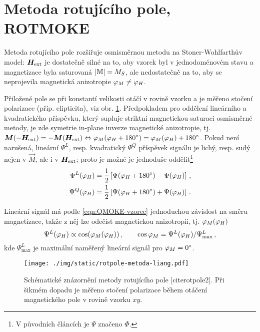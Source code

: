 \section{Metoda rotujícího pole, ROTMOKE}
\label{chap:ROTMOKE}

Metoda rotujícího pole\cite{liangSeparationLinearQuadratic2015,liangQuantitativeStudyQuadratic2015} rozšiřuje osmisměrnou metodu na Stoner-Wohlfarthův model: $\bm{H}_\textrm{ext}$ je dostatečně silné na to, aby vzorek byl v jednodoménovém stavu a magnetizace byla saturovaná $|\mathbb{M}|=M_S$, ale nedostatečně na to, aby se neprojevila magnetická anizotropie $\varphi_M\neq\varphi_H$.

Přiložené pole se při konstantí velikosti otáčí v rovině vzorku a je měřeno stočení polarizace (příp. elipticita), viz obr. \ref{fig:metoda-rotujiciho-pole}.
Předpokladem pro oddělení lineárního a kvadratického příspěvku, který supluje striktní magnetickou saturaci osmisměrné metody,
je zde symetrie in-plane inverze magnetické anizotropie, tj. $\bm{M}(-\bm{H}_\textrm{ext})=-\bm{M}(\bm{H}_\textrm{ext}) \Leftrightarrow \varphi_M(\varphi_H+\SI{180}{\degree})=\varphi_M(\varphi_H)+\SI{180}{\degree}$.
Pokud není narušená, lineární $\Psi^L$, resp. kvadratický $\Psi^Q$ příspěvek signálu je lichý, resp. sudý nejen v $\vec{M}$, ale i v $\bm{H}_\textrm{ext}$;
proto je možné je jednoduše oddělit\footnote{V původních článcích je $\Psi$ značeno $\Phi$.}
\begin{align}
    \Psi^L(\varphi_H)&=\frac{1}{2} \left[ \Psi(\varphi_H+\SI{180}{\degree}) - \Psi(\varphi_H) \right] 
    \,, \\ \Psi^Q(\varphi_H)&=\frac{1}{2} \left[ \Psi(\varphi_H+\SI{180}{\degree}) + \Psi(\varphi_H) \right] \,.
\end{align}

Lineární signál má podle \eqref{eqn:QMOKE-vzorec} jednoduchou závislost na směru magnetizace, takže z něj lze odečíst magnetickou anizotropii, tj. $\varphi_M(\varphi_H)$
\begin{equation}
    \Psi^L(\varphi_H)\propto \cos(\varphi_M(\varphi_H)) \,, \qquad \cos \varphi_M=\Psi^L(\varphi_H)/\Psi^L_\textrm{max} \,,
\end{equation}
kde $\Psi^L_\textrm{max}$ je maximální naměřený lineární signál pro $\varphi_M=\SI{0}{\degree}$.

\begin{figure}[htbp]
    \centering
    \texttt{[image: ./img/static/rotpole-metoda-liang.pdf]}
    \caption{Schématické znázornění metody rotujícího pole [cite{rotpole2]}. Při šikmém dopadu je měřeno stočení polarizace během otáčení magnetického pole v rovině vzorku $xy$. \cite{liangQuantitativeStudyQuadratic2015}}
    \label{fig:metoda-rotujiciho-pole}
\end{figure}

